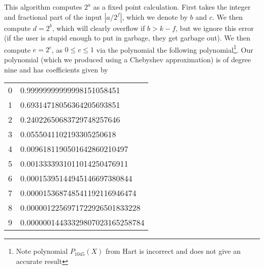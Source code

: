 This algorithm computes $2^a$ as a fixed point calculation.
First takes the integer and fractional part of the input
$|a/2^f|$, which we denote by $b$ and $c$.
We then compute $d=2^b$, which will clearly overflow
if $b>k-f$, but we ignore this error (if the user is stupid
enough to put in garbage, they get garbage out).
We then compute $e=2^c$, as $0 \le c \le 1$ via the 
polynomial the following polynomial\footnote{Note polynomial
$P_{1045}(X)$ from Hart \cite{Hart:1978:CA:540084} is incorrect
and does not give an accurate result}.
Our polynomial (which we produced using a Chebyshev approximation)
is of degree nine and has coefficients given by
\begin{center}
\begin{tabular}{|c|l|}
\hline
0 & 0.99999999999998151058451 \\
1 & 0.69314718056364205693851 \\
2 & 0.24022650683729748257646\\
3 & 0.0555041102193305250618 \\
4 & 0.0096181190501642860210497\\
5 & 0.0013333931011014250476911 \\
6 & 0.00015395144945146697380844\\
7 & 0.000015368748541192116946474 \\
8 & 0.0000012256971722926501833228\\
9 & 0.00000014433329807023165258784 \\
\hline
\end{tabular}
\end{center}
